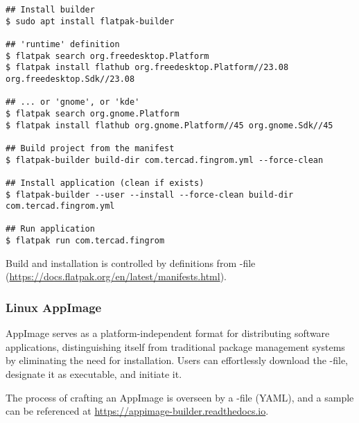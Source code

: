 \begin{lstlisting}[language=terminal]
## Install builder
$ sudo apt install flatpak-builder

## 'runtime' definition
$ flatpak search org.freedesktop.Platform
$ flatpak install flathub org.freedesktop.Platform//23.08 org.freedesktop.Sdk//23.08

## ... or 'gnome', or 'kde'
$ flatpak search org.gnome.Platform
$ flatpak install flathub org.gnome.Platform//45 org.gnome.Sdk//45

## Build project from the manifest
$ flatpak-builder build-dir com.tercad.fingrom.yml --force-clean

## Install application (clean if exists)
$ flatpak-builder --user --install --force-clean build-dir com.tercad.fingrom.yml

## Run application
$ flatpak run com.tercad.fingrom
\end{lstlisting}

\noindent Build and installation is controlled by definitions from -file
(\href{https://docs.flatpak.org/en/latest/manifests.html}{https://docs.flatpak.org/en/latest/manifests.html}).


\subsubsection{Linux AppImage}

AppImage serves as a platform-independent format for distributing software applications, distinguishing itself from 
traditional package management systems by eliminating the need for installation. Users can effortlessly download the 
-file, designate it as executable, and initiate it.

The process of crafting an AppImage is overseen by a -file (YAML), and a sample can be referenced at 
\href{https://appimage-builder.readthedocs.io}{https://appimage-builder.readthedocs.io}.


